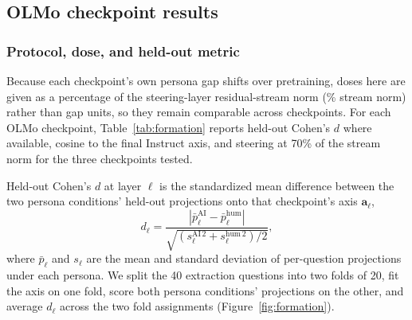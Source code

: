 \FloatBarrier

\subsection{OLMo checkpoint results}

\subsubsection{Protocol, dose, and held-out metric}

Because each checkpoint's own persona gap shifts over pretraining, doses here
are given as a percentage of the steering-layer residual-stream norm (\%
stream norm) rather than gap units, so they remain comparable across
checkpoints. For each OLMo checkpoint, Table~\ref{tab:formation} reports
held-out Cohen's $d$ where available, cosine to the final Instruct axis, and
steering at 70\% of the stream norm for the three checkpoints tested.

Held-out Cohen's $d$ at layer $\ell$ is the standardized mean difference
between the two persona conditions' held-out projections onto that
checkpoint's axis $\mathbf{a}_\ell$,
\begin{equation*}
  d_\ell = \frac{\left|\bar{p}_\ell^{\mathrm{AI}} - \bar{p}_\ell^{\mathrm{hum}}\right|}{\sqrt{\left(s_\ell^{\mathrm{AI}\,2} + s_\ell^{\mathrm{hum}\,2}\right)/2}},
\end{equation*}
where $\bar{p}_\ell$ and $s_\ell$ are the mean and standard deviation of
per-question projections under each persona. We split the 40 extraction
questions into two folds of 20, fit the axis on one fold, score both persona
conditions' projections on the other, and average $d_\ell$ across the two
fold assignments (Figure~\ref{fig:formation}).

